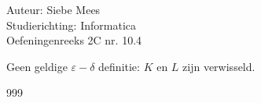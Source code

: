 \documentclass[a4paper]{article}
\begin{document}
  
\noindent \large Auteur:  Siebe Mees\\
\noindent \large Studierichting: Informatica\\
\noindent \large Oefeningenreeks 2C nr. 10.4\\

\medskip

\normalsize

Geen geldige $\varepsilon-\delta$ definitie: $K$ en $L$ zijn verwisseld.\\

\begin{thebibliography}{999}
\end{thebibliography}
\end{document}
